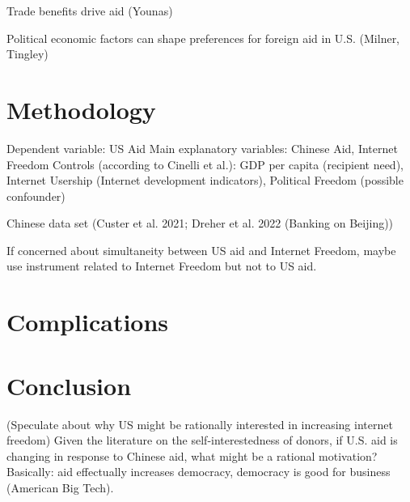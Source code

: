 \documentclass{article}
\begin{document}
Trade benefits drive aid (Younas)

Political economic factors can shape preferences for foreign aid in U.S. (Milner, Tingley)

\section*{Methodology}
Dependent variable: US Aid
Main explanatory variables: Chinese Aid, Internet Freedom
Controls (according to Cinelli et al.): GDP per capita (recipient need), Internet Usership (Internet development indicators), Political Freedom (possible confounder)

Chinese data set (Custer et al. 2021; Dreher et al. 2022 (Banking on Beijing))

If concerned about simultaneity between US aid and Internet Freedom, maybe use instrument related to Internet Freedom but not to US aid. 
\section*{Complications}
 

\section*{Conclusion}
(Speculate about why US might be rationally interested in increasing internet freedom) Given the literature on the self-interestedness of donors, if U.S. aid is changing in response to Chinese aid, what might be a rational motivation? Basically: aid effectually increases democracy, democracy is good for business (American Big Tech).

\pagebreak
\printbibliography
\end{document}
